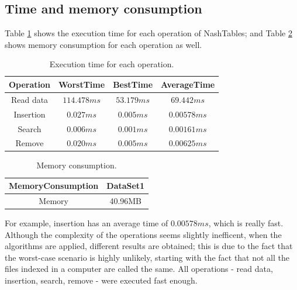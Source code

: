 \documentclass{sig-alternate-05-2015}
\begin{document}
  \subsection{Time and memory consumption}
  Table \ref{tab:exTime} shows the execution time for each operation of NashTables; and Table \ref{table:mem} shows
  memory consumption for each operation as well.
  \begin{table}
    \small
    \centering
    \caption{Execution time for each operation.}
    \label{tab:exTime}
    \begin{tabular}{cccc}
      \hline
      \textbf{Operation} & \textbf{WorstTime} & 	\textbf{BestTime} & \textbf{AverageTime} \\ \hline
      Read data          & $114.478ms$      & $53.179ms$      & $69.442ms$         \\
      Insertion          & $0.027ms$               & $0.005ms$               & $0.00578ms$               \\
      Search             & $0.006ms$               & $0.001ms$              & $0.00161ms$               \\
      Remove             & $0.020ms$              & $0.005ms$              & $0.00625ms$              \\ \hline
    \end{tabular}
  \end{table}
  \begin{table}[b]
    \centering
    \caption{Memory consumption.}
    \label{table:mem}
    \begin{tabular}{cc}
      \hline\rule{0pt}{2ex}
      \textbf{MemoryConsumption} & \textbf{DataSet1} \\ \hline\rule{0pt}{2ex}
      Memory                     & 40.96MB           \\ \hline
    \end{tabular}
  \end{table}
  For example, insertion has an average time of $0.00578ms$, which is really fast. Although the complexity of the operations
  seems slightly inefficent, when the algorithms are applied, different results are obtained; this is due to the fact that
  the worst-case scenario is highly unlikely, starting with the fact that not all the files indexed in a computer are called the
  same. All operations - read data, insertion, search, remove - were executed fast enough.

  
  
\end{document}
